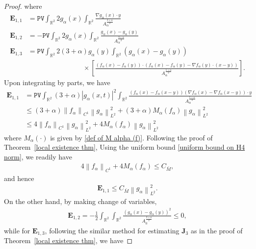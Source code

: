 \documentclass[reqno]{amsart}%
\theoremstyle{definition}
\theoremstyle{remark}
\numberwithin{equation}{section}
\newcommand{\0}{\mathbf{0}}
\newcommand{\1}{\mathbf{1}}
\newcommand{\R}{\mathbb R}
\newcommand{\PV}{\texttt{PV}}
\numberwithin{equation}{section}
\numberwithin{theorem}{section}
\numberwithin{figure}{section}
\begin{document}
\begin{proof}
where
\begin{align*}
\mathbf{E}_{1,1}&=\PV\int_{\mathbb{R}^{2}} 2g_{\alpha}(x) \int_{\mathbb{R}^{2}} \frac{\nabla g_{\alpha}(x) \cdot y}{A_{\alpha}^{\frac{3+\alpha}{ 2}} }\\
\mathbf{E}_{1,2}&=-\PV\int_{\mathbb{R}^{2}} 2g_{\alpha}(x) \int_{\mathbb{R}^{2}} \frac{g_{\alpha}(x)-g_{\alpha}(y)}{A_{\alpha}^{\frac{3+\alpha}{2}}} \\
\mathbf{E}_{1,3}&=\PV\int_{\mathbb{R}^{2}} 2(3+\alpha)g_{\alpha}(y) \int_{\mathbb{R}^{2}} (g_{\alpha}(x)-g_{\alpha}(y))\\
&\qquad\qquad\qquad\qquad\times\left[\frac{\left(f_{\alpha}(x)-f_{\alpha}(y)\right) \cdot\left(f_{\alpha}(x)-f_{\alpha}(y)-\nabla f_{\alpha}(y) \cdot(x-y)\right)}{A_{\alpha}^{\frac{5+\alpha}{2}}}\right]. 
\end{align*}
Upon integrating by parts, we have
\begin{align*}
\mathbf{E}_{1,1}&=\PV \int_{\mathbb{R}^{2}} (3+\alpha)|g_{\alpha}(x, t)|^{2}\int_{\mathbb{R}^{2}}\frac{\left(f_{\alpha}(x)-f_{\alpha}(x-y)\right)\left(\nabla f_{\alpha}(x)-\nabla f_{\alpha}(x-y)\right) \cdot y}{A_{\alpha}^{\frac{5+\alpha}{ 2}} }\\
&\le (3+\alpha)\left\|f_{\alpha}\right\|_{ C^{1}}\left\|g_{\alpha}\right\|_{L^{2}}^{2}+(3+\alpha) M_{\alpha}\left(f_{\alpha}\right)\left\|g_{\alpha}\right\|_{L^{2}}^{2}\\
&\le 4\left\|f_{\alpha}\right\|_{ C^{1}}\left\|g_{\alpha}\right\|_{L^{2}}^{2} + 4M_{\alpha}\left(f_{\alpha}\right)\left\|g_{\alpha}\right\|_{L^{2}}^{2}
\end{align*}
where $M_\alpha(\cdot)$ is given by \eqref{def of M alpha (f)}. Following the proof of Theorem~\ref{local existence thm}, Using the uniform bound \eqref{uniform bound on H4 norm}, we readily have
\begin{align*}
4\left\|f_{\alpha}\right\|_{ C^{1}}+4M_{\alpha}(f_{\alpha})\le C_{\bar{M}},
\end{align*}
and hence
\begin{align*}
\mathbf{E}_{1,1}\le C_{\bar{M}}\left\|g_{\alpha}\right\|_{L^{2}}^{2}.
\end{align*}
On the other hand, by making change of variables,
\begin{align*}
\mathbf{E}_{1,2}=-\frac{1}{2}\int_{\R^2}\int_{\R^2}\frac{(g_\alpha(x)-g_\alpha(y))^2}{A_{0}^\frac{3+\alpha}{2}}\le 0,
\end{align*}
while for $\mathbf{E}_{1,3}$, following the similar method for estimating $\mathbf{J}_3$ as in the proof of Theorem~\ref{local existence thm}, we have

\end{proof}
\end{document}
